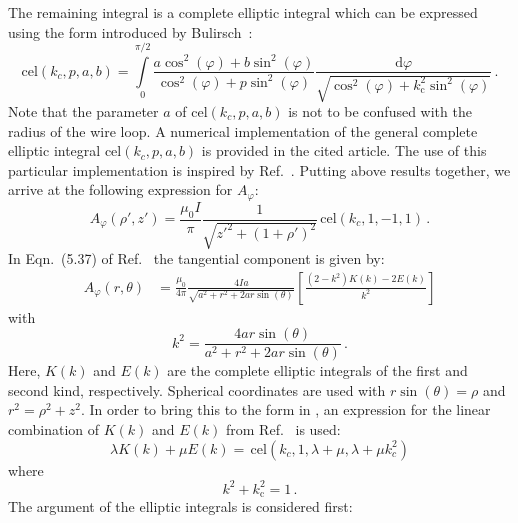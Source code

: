 The remaining integral is a complete elliptic integral which can be expressed using the form
introduced by Bulirsch~\cite{bulirsch_3}:
\begin{equation}
  \mathrm{cel}(k_c, p, a, b)
= \int\limits_{0}^{\pi/2}
   \frac{a \cos^2(\varphi) + b \sin^2(\varphi)}
        {  \cos^2(\varphi) + p \sin^2(\varphi)}
   \frac{\mathrm{d}\varphi}
        {\sqrt{\cos^2(\varphi) + k_\mathrm{c}^2 \sin^2(\varphi)}} \, .
\end{equation}
Note that the parameter $a$ of $\mathrm{cel}(k_c, p, a, b)$ is not to be confused with the radius of the wire loop.
A numerical implementation of the general complete elliptic integral $\mathrm{cel}(k_c, p, a, b)$ is provided in the cited article.
The use of this particular implementation is inspired by Ref.~\cite{teal}.
Putting above results together, we arrive at the following expression for $A_\varphi$:
\begin{equation}
 \boxed{A_\varphi(\rho', z') = \frac{\mu_0 I}{\pi}
                               \frac{1}{\sqrt{z'^2 + (1 + \rho')^2}}
                               \,\mathrm{cel}(k_c, 1, -1, 1)} \, . \label{eqn:A_phi_final}
\end{equation}
In Eqn.~(5.37) of Ref.~\cite{jackson} the tangential component is given by:
\begin{align}
  A_\varphi(r, \theta) &= \frac{\mu_0}{4 \pi}
                          \frac{4 I a}{\sqrt{a^2 + r^2 + 2 a r \sin(\theta)}}
                          \left[
                            \frac{(2 - k^2)K(k) - 2 E(k)}{k^2}
                          \right] \label{eqn:aphi_initial}
\end{align}
with
\begin{equation}
  k^2 = \frac{4 a r \sin(\theta)}{a^2 + r^2 + 2 a r \sin(\theta)} \, .
\end{equation}
Here, $K(k)$ and $E(k)$ are the complete elliptic integrals of the first and second kind, respectively.
Spherical coordinates are used with $r \sin(\theta) = \rho$ and $r^2 = \rho^2 + z^2$.
In order to bring this to the form in ,
an expression for the linear combination of $K(k)$ and $E(k)$ from Ref.~\cite{bulirsch_3} is used:
\begin{equation}
  \lambda K(k) + \mu E(k) = \,\mathrm{cel}(k_c, 1, \lambda + \mu, \lambda + \mu k_c^2)
\end{equation}
where
\begin{equation}
  k^2 + k_\mathrm{c}^2 = 1 \, .
\end{equation}
The argument of the elliptic integrals is considered first:
